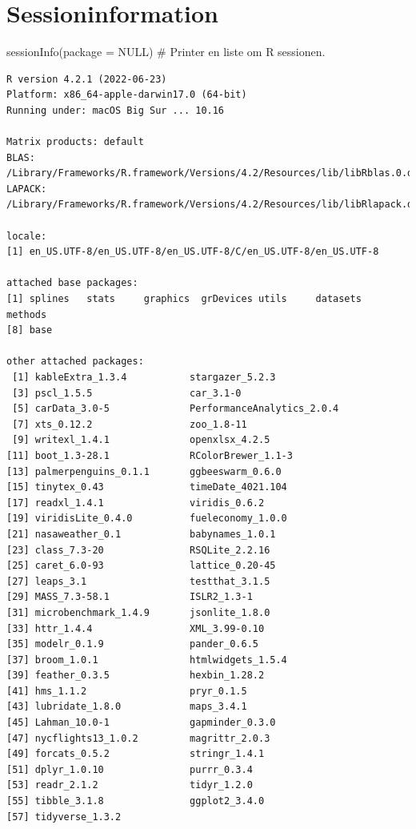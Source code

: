 \documentclass[
  12pt,
  a4paper,
  DIV=11,
  numbers=noendperiod]{scrartcl}
\newenvironment{Shaded}{\begin{snugshade}}{\end{snugshade}}
\newcommand{\AttributeTok}[1]{\textcolor[rgb]{0.40,0.45,0.13}{#1}}
\newcommand{\CommentTok}[1]{\textcolor[rgb]{0.37,0.37,0.37}{#1}}
\newcommand{\ConstantTok}[1]{\textcolor[rgb]{0.56,0.35,0.01}{#1}}
\newcommand{\FunctionTok}[1]{\textcolor[rgb]{0.28,0.35,0.67}{#1}}
\newcommand{\NormalTok}[1]{\textcolor[rgb]{0.00,0.23,0.31}{#1}}
\begin{document}
\hypertarget{sessioninformation}{%
\section{Sessioninformation}\label{sessioninformation}}

\begin{Shaded}
\begin{Highlighting}[numbers=left,,]
\FunctionTok{sessionInfo}\NormalTok{(}\AttributeTok{package =} \ConstantTok{NULL}\NormalTok{) }\CommentTok{\# Printer en liste om R sessionen.}
\end{Highlighting}
\end{Shaded}

\begin{verbatim}
R version 4.2.1 (2022-06-23)
Platform: x86_64-apple-darwin17.0 (64-bit)
Running under: macOS Big Sur ... 10.16

Matrix products: default
BLAS:   /Library/Frameworks/R.framework/Versions/4.2/Resources/lib/libRblas.0.dylib
LAPACK: /Library/Frameworks/R.framework/Versions/4.2/Resources/lib/libRlapack.dylib

locale:
[1] en_US.UTF-8/en_US.UTF-8/en_US.UTF-8/C/en_US.UTF-8/en_US.UTF-8

attached base packages:
[1] splines   stats     graphics  grDevices utils     datasets  methods  
[8] base     

other attached packages:
 [1] kableExtra_1.3.4           stargazer_5.2.3           
 [3] pscl_1.5.5                 car_3.1-0                 
 [5] carData_3.0-5              PerformanceAnalytics_2.0.4
 [7] xts_0.12.2                 zoo_1.8-11                
 [9] writexl_1.4.1              openxlsx_4.2.5            
[11] boot_1.3-28.1              RColorBrewer_1.1-3        
[13] palmerpenguins_0.1.1       ggbeeswarm_0.6.0          
[15] tinytex_0.43               timeDate_4021.104         
[17] readxl_1.4.1               viridis_0.6.2             
[19] viridisLite_0.4.0          fueleconomy_1.0.0         
[21] nasaweather_0.1            babynames_1.0.1           
[23] class_7.3-20               RSQLite_2.2.16            
[25] caret_6.0-93               lattice_0.20-45           
[27] leaps_3.1                  testthat_3.1.5            
[29] MASS_7.3-58.1              ISLR2_1.3-1               
[31] microbenchmark_1.4.9       jsonlite_1.8.0            
[33] httr_1.4.4                 XML_3.99-0.10             
[35] modelr_0.1.9               pander_0.6.5              
[37] broom_1.0.1                htmlwidgets_1.5.4         
[39] feather_0.3.5              hexbin_1.28.2             
[41] hms_1.1.2                  pryr_0.1.5                
[43] lubridate_1.8.0            maps_3.4.1                
[45] Lahman_10.0-1              gapminder_0.3.0           
[47] nycflights13_1.0.2         magrittr_2.0.3            
[49] forcats_0.5.2              stringr_1.4.1             
[51] dplyr_1.0.10               purrr_0.3.4               
[53] readr_2.1.2                tidyr_1.2.0               
[55] tibble_3.1.8               ggplot2_3.4.0             
[57] tidyverse_1.3.2           


\end{verbatim}
\end{document}
